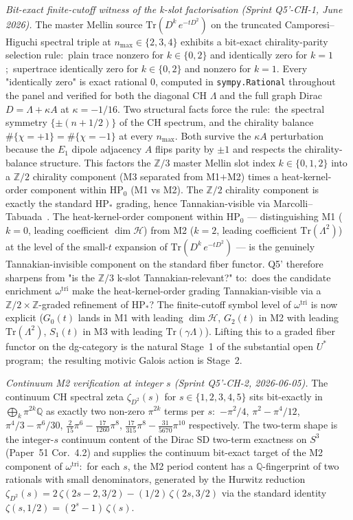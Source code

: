 \documentclass[11pt,a4paper]{article}
\theoremstyle{plain}
\theoremstyle{definition}
\newcommand{\sthree}{S^{3}}
\newcommand{\Z}{\mathbb{Z}}
\newcommand{\Q}{\mathbb{Q}}
\begin{document}
\emph{Bit-exact finite-cutoff witness of the k-slot factorisation
(Sprint Q5'-CH-1, June 2026).}  The master Mellin
source $\mathrm{Tr}(D^k\,e^{-tD^2})$ on the truncated Camporesi--Higuchi
spectral triple at $n_{\max} \in \{2, 3, 4\}$ exhibits a bit-exact
chirality-parity selection rule:\ plain trace nonzero for $k \in \{0,
2\}$ and identically zero for $k = 1$;\ supertrace identically zero
for $k \in \{0, 2\}$ and nonzero for $k = 1$.  Every "identically zero"
is exact rational $0$, computed in \texttt{sympy.Rational} throughout
the panel and verified for both the diagonal CH $\Lambda$ and the full
graph Dirac $D = \Lambda + \kappa A$ at $\kappa = -1/16$.  Two
structural facts force the rule:\ the spectral symmetry
$\{\pm(n + 1/2)\}$ of the CH spectrum, and the chirality balance
$\#\{\chi = +1\} = \#\{\chi = -1\}$ at every $n_{\max}$.  Both survive
the $\kappa A$ perturbation because the $E_1$ dipole adjacency $A$ flips
parity by $\pm 1$ and respects the chirality-balance structure.  This
factors the $\Z/3$ master Mellin slot index $k \in \{0, 1, 2\}$ into a
$\Z/2$ chirality component (M3 separated from M1$+$M2) times a
heat-kernel-order component within HP$_0$ (M1 vs M2).  The $\Z/2$
chirality component is exactly the standard $\mathrm{HP}_*$ grading,
hence Tannakian-visible via Marcolli--Tabuada~\cite{marcolli_tabuada2014a}.
The heat-kernel-order component within HP$_0$ --- distinguishing M1
($k = 0$, leading coefficient $\dim \mathcal{H}$) from M2 ($k = 2$,
leading coefficient $\mathrm{Tr}(\Lambda^2)$) at the level of the
small-$t$ expansion of $\mathrm{Tr}(D^k\,e^{-tD^2})$ --- is the
genuinely Tannakian-invisible component on the standard fiber functor.
Q5' therefore sharpens from "is the $\Z/3$ k-slot Tannakian-relevant?"
to:\ does the candidate enrichment $\omega^{\mathrm{tri}}$ make the
heat-kernel-order grading Tannakian-visible via a
$\Z/2 \times \mathbb{Z}$-graded refinement of $\mathrm{HP}_*$?  The
finite-cutoff symbol level of $\omega^{\mathrm{tri}}$ is now explicit
($G_0(t)$ lands in M1 with leading $\dim \mathcal{H}$, $G_2(t)$ in M2
with leading $\mathrm{Tr}(\Lambda^2)$, $S_1(t)$ in M3 with leading
$\mathrm{Tr}(\gamma \Lambda)$).  Lifting this to a graded fiber functor
on the dg-category is the natural Stage~1 of the substantial open $U^*$
program;\ the resulting motivic Galois action is Stage~2.

\emph{Continuum M2 verification at integer $s$ (Sprint Q5'-CH-2,
2026-06-05).}  The
continuum CH spectral zeta $\zeta_{D^2}(s)$ for $s \in \{1, 2, 3, 4, 5\}$
sits bit-exactly in $\bigoplus_k \pi^{2k}\Q$ as exactly two non-zero
$\pi^{2k}$ terms per $s$:\ $-\pi^2/4$, $\pi^2 - \pi^4/12$,
$\pi^4/3 - \pi^6/30$, $\tfrac{2}{15}\pi^6 - \tfrac{17}{1260}\pi^8$,
$\tfrac{17}{315}\pi^8 - \tfrac{31}{5670}\pi^{10}$ respectively.  The
two-term shape is the integer-$s$ continuum content of the Dirac
SD two-term exactness on $\sthree$ (Paper~51 Cor.~4.2) and supplies the
continuum bit-exact target of the M2 component of
$\omega^{\mathrm{tri}}$:\ for each $s$, the M2 period content has a
$\Q$-fingerprint of two rationals with small denominators, generated by
the Hurwitz reduction
$\zeta_{D^2}(s) = 2\,\zeta(2s-2, 3/2) - (1/2)\,\zeta(2s, 3/2)$ via the
standard identity $\zeta(s, 1/2) = (2^s - 1)\,\zeta(s)$.
\end{document}
